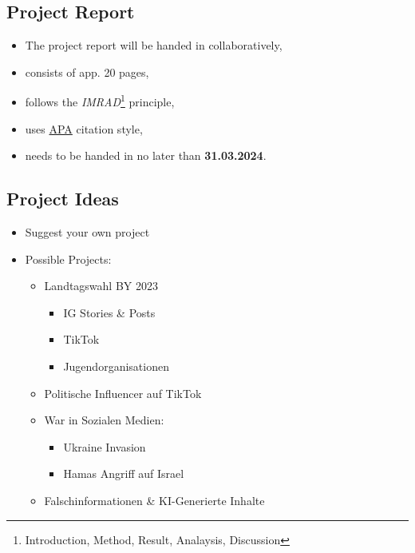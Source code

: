 \documentclass[
  letterpaper,
  DIV=11,
  numbers=noendperiod]{scrartcl}
\providecommand{\tightlist}{%
  \setlength{\itemsep}{0pt}\setlength{\parskip}{0pt}}\usepackage{longtable,booktabs,array}
\begin{document}
\hypertarget{project-report}{%
\subsection{Project Report}\label{project-report}}

\begin{itemize}
\tightlist
\item
  The project report will be handed in collaboratively,
\item
  consists of app. 20 pages,
\item
  follows the \emph{IMRAD}\footnote{Introduction, Method, Result,
    Analaysis, Discussion} principle,
\item
  uses \href{https://apastyle.apa.org/}{APA} citation style,
\item
  needs to be handed in no later than \textbf{31.03.2024}.
\end{itemize}

\hypertarget{project-ideas}{%
\subsection{Project Ideas}\label{project-ideas}}

\begin{itemize}
\tightlist
\item
  Suggest your own project
\item
  Possible Projects:

  \begin{itemize}
  \tightlist
  \item
    Landtagswahl BY 2023

    \begin{itemize}
    \tightlist
    \item
      IG Stories \& Posts
    \item
      TikTok
    \item
      Jugendorganisationen
    \end{itemize}
  \item
    Politische Influencer auf TikTok
  \item
    War in Sozialen Medien:

    \begin{itemize}
    \tightlist
    \item
      Ukraine Invasion
    \item
      Hamas Angriff auf Israel
    \end{itemize}
  \item
    Falschinformationen \& KI-Generierte Inhalte
  \end{itemize}
\end{itemize}
\end{document}

